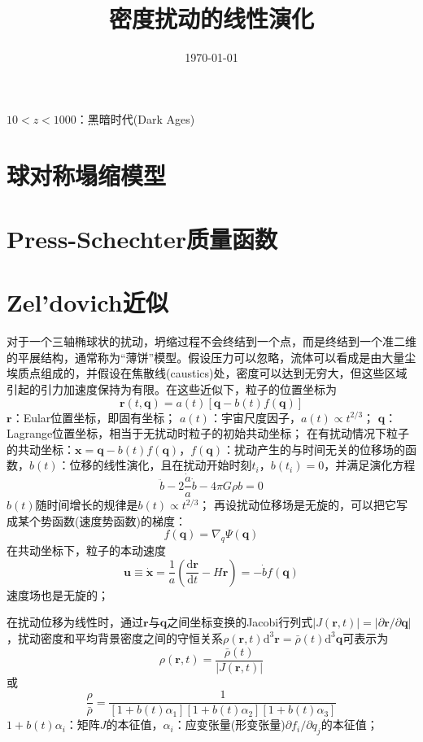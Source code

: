 \documentclass[12pt,a4paper]{article}
\title{密度扰动的线性演化}
\author{}
\date{\today}
\renewcommand{\vec}[1]{\boldsymbol{#1}}
\newcommand{\dif}{\mathrm{d}}
\begin{document}
\maketitle

$10 < z < 1000$：黑暗时代(Dark Ages)

\section{球对称塌缩模型}




\section{Press-Schechter质量函数}


\section{Zel'dovich近似}

对于一个三轴椭球状的扰动，坍缩过程不会终结到一个点，而是终结到一个准二维的平展结构，通常称为“薄饼”模型。假设压力可以忽略，流体可以看成是由大量尘埃质点组成的，并假设在焦散线(caustics)处，密度可以达到无穷大，但这些区域引起的引力加速度保持为有限。在这些近似下，粒子的位置坐标为
\begin{equation}
\vec{r} (t, \vec{q}) = a(t) [\vec{q} -b(t) f(\vec{q})] 
\end{equation}
$\vec{r}$：Eular位置坐标，即固有坐标；
$a(t)$：宇宙尺度因子，$a(t) \propto t^{2/3}$；
$\vec{q}$：Lagrange位置坐标，相当于无扰动时粒子的初始共动坐标；
在有扰动情况下粒子的共动坐标：$\vec{x} = \vec{q} -b(t) f(\vec{q})$，$f(\vec{q})$：扰动产生的与时间无关的位移场的函数，$b(t)$：位移的线性演化，且在扰动开始时刻$t_i$，$b(t_i) = 0$，并满足演化方程
\begin{equation}
\ddot{b} - 2\frac{\dot{a}}{a} \dot{b} - 4\pi G \rho b = 0
\end{equation}
$b(t)$随时间增长的规律是$b(t) \propto t^{2/3}$；
再设扰动位移场是无旋的，可以把它写成某个势函数(速度势函数)的梯度：
\begin{equation}
f(\vec{q}) = \nabla_{q} \Psi(\vec{q})
\end{equation}
在共动坐标下，粒子的本动速度
\begin{equation}
\vec{u} \equiv \dot{\vec{x}} = \frac{1}{a} \left( \frac{\dif \vec{r}}{\dif t} -H\vec{r}\right) = -\dot{b} f(\vec{q})
\end{equation}
速度场也是无旋的；

在扰动位移为线性时，通过$\vec{r}$与$\vec{q}$之间坐标变换的Jacobi行列式$|J(\vec{r}, t)| = |\partial \vec{r}/\partial \vec{q}|$，扰动密度和平均背景密度之间的守恒关系$\rho(\vec{r}, t) \dif^3 \vec{r} = \bar{\rho}(t) \dif^3 \vec{q}$可表示为
\begin{equation}
\rho(\vec{r}, t) = \frac{\bar{\rho}(t)}{|J(\vec{r}, t)|}
\end{equation}
或
\begin{equation}
\frac{\rho}{\bar{\rho}} = \frac{1}{[1+b(t)\alpha_1][1+b(t)\alpha_2][1+b(t)\alpha_3]}
\end{equation}
$1+b(t)\alpha_i$：矩阵$J$的本征值，$\alpha_i$：应变张量(形变张量)$\partial f_i/\partial q_j$的本征值；
\end{document}
